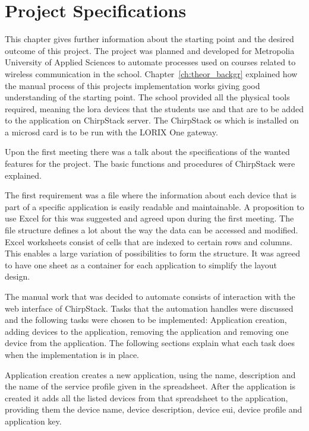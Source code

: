 
\chapter{Project Specifications} \label{ch:project_spec}
This chapter gives further information about the starting point and the desired outcome of this project.
The project was planned and developed for Metropolia University of Applied Sciences to automate processes used on courses related to wireless communication in the school.
Chapter~\ref{ch:theor_backgr} explained how the manual process of this projects implementation works giving good understanding of the starting point.
The school provided all the physical tools required, meaning the \gls{lora} devices that the students use and that are to be added to the application on ChirpStack server.
The ChirpStack \gls{os} which is installed on a micro\gls{sd} card is to be run with the LORIX One gateway.

Upon the first meeting there was a talk about the specifications of the wanted features for the project.
The basic functions and procedures of ChirpStack were explained.

The first requirement was a file where the information about each device that is part of a specific application is easily readable and maintainable.
A proposition to use Excel for this was suggested and agreed upon during the first meeting.
The file structure defines a lot about the way the data can be accessed and modified.
Excel worksheets consist of cells that are indexed to certain rows and columns.
This enables a large variation of possibilities to form the structure.
It was agreed to have one sheet as a container for each application to simplify the layout design.

The manual work that was decided to automate consists of interaction with the web interface of ChirpStack.
Tasks that the automation handles were discussed and the following tasks were chosen to be implemented: Application creation, adding devices to the application, removing the application and removing one device from the application.
The following sections explain what each task does when the implementation is in place.

Application creation creates a new application, using the name, description and the name of the service profile given in the spreadsheet.
After the application is created it adds all the listed devices from that spreadsheet to the application, providing them the device name, device description, device \gls{eui}, device profile and application key.

